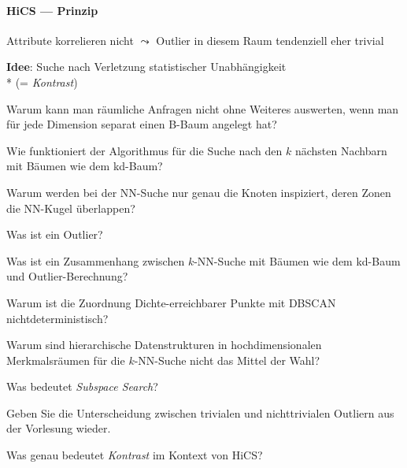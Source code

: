 \paragraph{HiCS --- Prinzip}
\begin{items}
	\item Attribute korrelieren nicht \( \leadsto \) Outlier in diesem Raum tendenziell eher trivial
	\item \textbf{Idee}: Suche nach Verletzung statistischer Unabhängigkeit \\* (= \emph{Kontrast})
\end{items}

\begin{fragen}
	\item Warum kann man räumliche Anfragen nicht ohne Weiteres auswerten, wenn man für jede Dimension separat einen B-Baum angelegt hat?
	\item Wie funktioniert der Algorithmus für die Suche nach den \( k \) nächsten Nachbarn mit Bäumen wie dem kd-Baum?
	\item Warum werden bei der NN-Suche nur genau die Knoten inspiziert, deren Zonen die NN-Kugel überlappen?
	\item Was ist ein Outlier?
	\item Was ist ein Zusammenhang zwischen \( k \)-NN-Suche mit Bäumen wie dem kd-Baum und Outlier-Berechnung?
	\item Warum ist die Zuordnung Dichte-erreichbarer Punkte mit DBSCAN nichtdeterministisch?
	\item Warum sind hierarchische Datenstrukturen in hochdimensionalen Merkmalsräumen für die \( k \)-NN-Suche nicht das Mittel der Wahl?
	\item Was bedeutet \emph{Subspace Search}?
	\item Geben Sie die Unterscheidung zwischen trivialen und nichttrivialen Outliern aus der Vorlesung wieder.
	\item Was genau bedeutet \emph{Kontrast} im Kontext von HiCS?
\end{fragen}